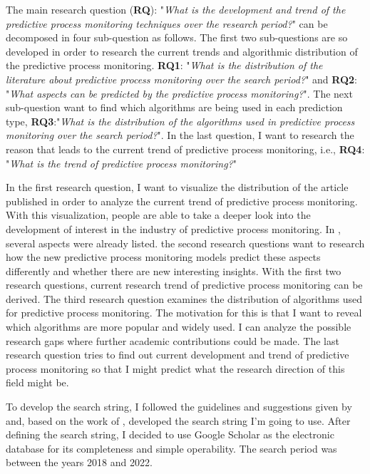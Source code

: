 \documentclass[runningheads]{llncs}
\begin{document}
		The main research question (\textbf{RQ}): "\textit{What is the development and trend of the predictive process monitoring techniques over the research period?}" can be decomposed in four sub-question as follows. The first two sub-questions are so developed in order to research the current trends and algorithmic distribution of the predictive process monitoring. \textbf{RQ1}: "\textit{What is the distribution of the literature about predictive process monitoring over the search period?}" and \textbf{RQ2}: "\textit{What aspects can be predicted by the predictive process monitoring?}". The next sub-question want to find which algorithms are being used in each prediction type, \textbf{RQ3}:"\textit{What is the distribution of the algorithms used in predictive process monitoring over the search period?}". In the last question, I want to research the reason that leads to the current trend of predictive process monitoring, i.e., \textbf{RQ4}: "\textit{What is the trend of predictive process monitoring?}"
		
		In the first research question, I want to visualize the distribution of the article published in order to analyze the current trend of predictive process monitoring. With this visualization, people are able to take a deeper look into the development of interest in the industry of predictive process monitoring. In \cite{original}, several aspects were already listed. the second research questions want to research how the new predictive process monitoring models predict these aspects differently and whether there are new interesting insights. With the first two research questions, current research trend of predictive process monitoring can be derived. The third research question examines the distribution of algorithms used for predictive process monitoring. The motivation for this is that I want to reveal which algorithms are more popular and widely used. I can analyze the possible research gaps where further academic contributions could be made. The last research question tries to find out current development and trend of predictive process monitoring so that I might predict what the research direction of this field might be.
		
		To develop the search string, I followed the guidelines and suggestions given by \cite{guideline} and, based on the work of \cite{original}, developed the search string I'm going to use. After defining the search string, I decided to use Google Scholar as the electronic database for its completeness and simple operability. The search period was between the years 2018 and 2022.
		
\end{document}
